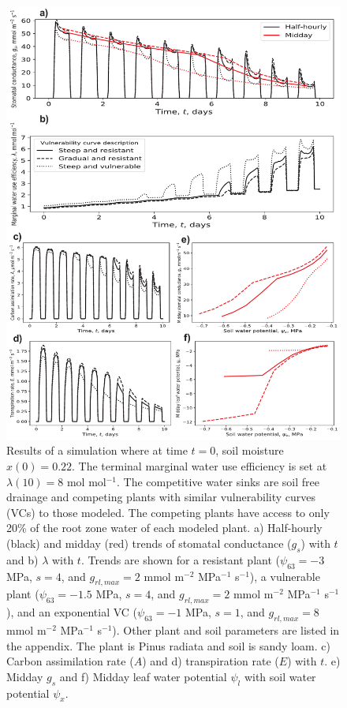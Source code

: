 \documentclass[utf8]{frontiersSCNS} %
\begin{document}
\begin{figure}[h]
    \begin{center}
         \includegraphics[scale=0.65]{WUS_comp.pdf}   
    \end{center}
    \caption{Results of a simulation where at time $t=0$, soil moisture $x(0) =0.22$. The terminal marginal water use efficiency is set at $\lambda(10) = 8$ mol mol$^{-1}$. The competitive water sinks are soil free drainage and competing plants with similar vulnerability curves (VCs) to those modeled. The competing plants have access to only 20\% of the root zone water of each modeled plant. a) Half-hourly (black) and midday (red) trends of stomatal conductance ($g_s$) with $t$ and b) $\lambda$ with $t$. Trends are shown for a resistant plant ($\psi_{63} = -3$ MPa, $s=4$, and $g_{rl,max} = 2$ mmol m$^{-2}$ MPa$^{-1}$ s$^{-1}$), a vulnerable plant ($\psi_{63} = -1.5$ MPa, $s=4$, and $g_{rl,max} = 2$ mmol m$^{-2}$ MPa$^{-1}$ s$^{-1}$), and an exponential VC ($\psi_{63} = -1$ MPa, $s=1$, and $g_{rl,max} = 8$ mmol m$^{-2}$ MPa$^{-1}$ s$^{-1}$). Other plant and soil parameters are listed in the appendix. The plant is Pinus radiata and soil is sandy loam. c) Carbon assimilation rate ($A$) and d) transpiration rate ($E$) with $t$. e) Midday $g_s$ and f) Midday leaf water potential $\psi_l$ with soil water potential $\psi_x$.}
    \label{fig:WUS_comp}
\end{figure}
\end{document}
